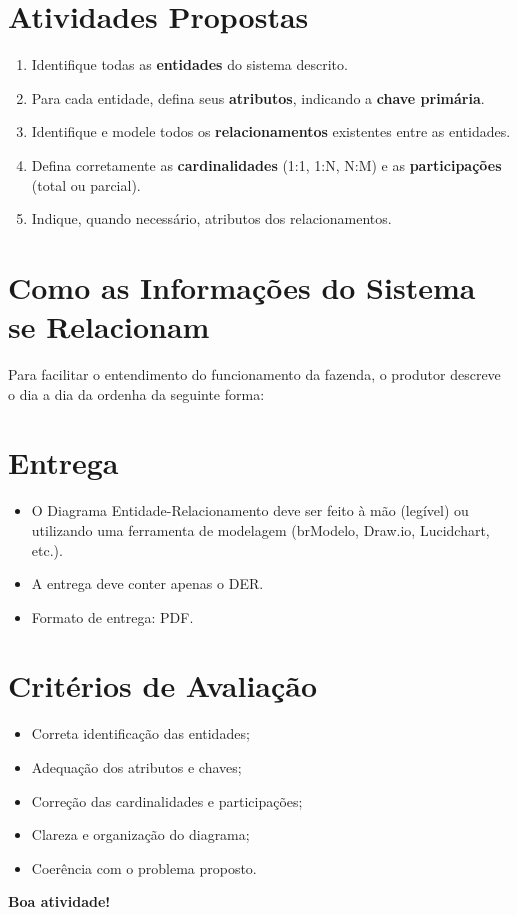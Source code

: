 \documentclass[12pt]{article}
\begin{document}
\section*{Atividades Propostas}

\begin{enumerate}[label=\alph*)]
    \item Identifique todas as \textbf{entidades} do sistema descrito.
    \item Para cada entidade, defina seus \textbf{atributos}, indicando a \textbf{chave primária}.
    \item Identifique e modele todos os \textbf{relacionamentos} existentes entre as entidades.
    \item Defina corretamente as \textbf{cardinalidades} (1:1, 1:N, N:M) e as \textbf{participações}
    (total ou parcial).
    


    \item Indique, quando necessário, atributos dos relacionamentos.
\end{enumerate}
\section*{Como as Informações do Sistema se Relacionam}

Para facilitar o entendimento do funcionamento da fazenda, o produtor descreve
o dia a dia da ordenha da seguinte forma:



\section*{Entrega}
\begin{itemize}
    \item O Diagrama Entidade-Relacionamento deve ser feito à mão (legível) ou utilizando
    uma ferramenta de modelagem (brModelo, Draw.io, Lucidchart, etc.).
    \item A entrega deve conter apenas o DER.
    \item Formato de entrega: PDF.
\end{itemize}

\section*{Critérios de Avaliação}
\begin{itemize}
    \item Correta identificação das entidades;
    \item Adequação dos atributos e chaves;
    \item Correção das cardinalidades e participações;
    \item Clareza e organização do diagrama;
    \item Coerência com o problema proposto.
\end{itemize}

\vspace{0.5cm}
\begin{center}
    \textbf{Boa atividade!}
\end{center}

 
\end{document}
